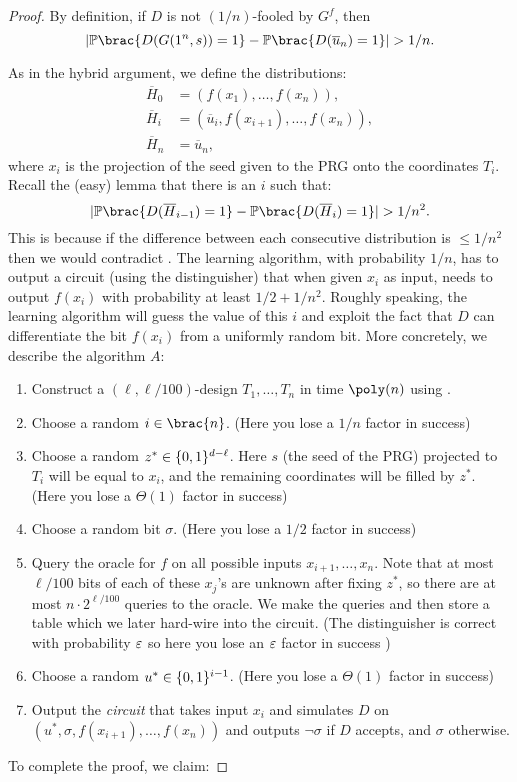 \begin{proof}
	By definition, if $D$ is not $(1/n)$-fooled by $G^f$, then
	\begin{equation}\label{eq:dist-NW-prg}
		\card{\Pr\brac{D(G(1^n, s)) = 1} - \Pr\brac{D(\overline{u}_n) = 1}} > 1/n.
	\end{equation}
	
	As in the hybrid argument, we define the distributions:
	\begin{align*}
		\overline{H}_0 &= (f(x_1), \ldots, f(x_n)),\\
		\overline{H}_i &= (\overline{u}_i, f(x_{i + 1}), \ldots, f(x_n)),\\
		\overline{H}_n &= \overline{u}_n,
	\end{align*}
	where $x_i$ is the projection of the seed given to the PRG onto the
	coordinates $T_i$. Recall the (easy) lemma that there is an $i$ such that:
	\[
	\card{\Pr\brac{D(\overline{H}_{i - 1}) = 1} - \Pr\brac{D(\overline{H}_i) = 1}} > 1 / n^2.
	\]
	This is because if the difference between each consecutive distribution is $\leq 1/n^2$ then we would contradict .
	The learning algorithm, with probability $1/n$, has to output a circuit (using the distinguisher) that when given $x_i$ as input, needs to output $f(x_i)$ with probability at least $1/2 + 1/n^2$.
	Roughly speaking, the learning algorithm will guess the value of this $i$ and
	exploit the fact that $D$ can differentiate the bit $f(x_i)$ from a uniformly
	random bit. More concretely, we describe the algorithm $A$:
	\begin{enumerate}
		\item Construct a $(\ell, \ell/100)$-design $T_1, \dots, T_n$ in
		time $\poly(n)$ using .
		\item Choose a random $i \in \brac{n}$. (Here you lose a $1/n$ factor in success)
		\item Choose a random $z^* \in \{0, 1\}^{d - \ell}$. Here $s$
		(the seed of the PRG) projected to $T_i$ will be equal to $x_i$,
		and the remaining coordinates will be filled by $z^*$. (Here you lose a $\Theta(1)$ factor in success)
		\item Choose a random bit $\sigma$. (Here you lose a $1/2$ factor in success)
		\item Query the oracle for $f$ on all possible inputs
		$x_{i + 1}, \ldots , x_n$. Note that at most $\ell / 100$ bits of
		each of these $x_j$'s are unknown after fixing $z^*$, so there
		are at most $n \cdot 2^{\ell / 100}$ queries to the oracle. We make the queries and then store a table which we later hard-wire into the circuit. (The distinguisher is correct with probability $\varepsilon$ so here you lose an $\varepsilon$ factor in success )
		\item Choose a random $u^* \in \{0, 1\}^{i - 1}$. (Here you lose a $\Theta(1)$ factor in success)
		\item Output the \emph{circuit} that takes input $x_i$ and simulates
		$D$ on $(u^*, \sigma, f(x_{i + 1}), \ldots , f(x_n))$ and outputs
		$\lnot \sigma$ if $D$ accepts, and $\sigma$ otherwise. 
	\end{enumerate}
	To complete the proof, we claim:
	

\end{proof}
